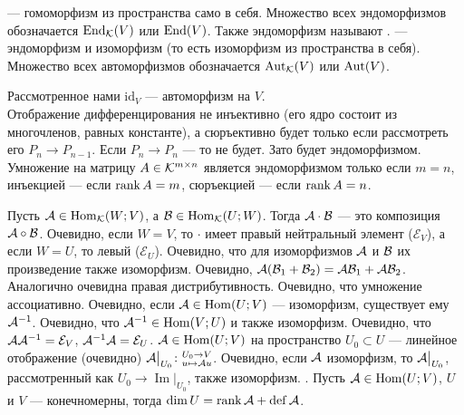 \documentclass{article}
\DeclareMathOperator{\operIm}{Im}
\let\Im\operIm
\newcommand{\id}{{\mathcal{E}}}
\begin{document}
\begin{itemize}
\begin{Proof}
        \end{Proof}
        \dfn {} --- гомоморфизм из пространства само в себя. Множество всех эндоморфизмов обозначается $\operatorname{End}_{\mathcal{K}}(V)$ или $\operatorname{End}(V)$. Также эндоморфизм называют .
        \dfn {} --- эндоморфизм и изоморфизм (то есть изоморфизм из пространства в себя). Множество всех автоморфизмов обозначается $\operatorname{Aut}_{\mathcal{K}}(V)$ или $\operatorname{Aut}(V)$.
        \begin{Example}
            Рассмотренное нами $\mathrm{id}_V$ --- автоморфизм на $V$.\\
            Отображение дифференцирования не инъективно (его ядро состоит из многочленов, равных константе), а сюръективно будет только если рассмотреть его $P_n\to P_{n-1}$. Если $P_n\to P_n$ --- то не будет. Зато будет эндоморфизмом.\\
            Умножение на матрицу $A\in{\mathcal{K}}^{m\times n}$ является эндоморфизмом только если $m=n$, инъекцией --- если $\operatorname{rank} A=m$, сюръекцией --- если $\operatorname{rank} A=n$.
        \end{Example}
        \dfn Пусть ${\mathcal{A}}\in\operatorname{Hom}_{\mathcal{K}}(W;V)$, а ${\mathcal{B}}\in\operatorname{Hom}_{\mathcal{K}}(U;W)$. Тогда  ${\mathcal{A}}\cdot{\mathcal{B}}$ --- это композиция ${\mathcal{A}}\circ{\mathcal{B}}$.
        \thm Очевидно, если $W=V$, то $\cdot$ имеет правый нейтральный элемент ($\id_V$), а если $W=U$, то левый ($\id_U$).
        \thm Очевидно, что для изоморфизмов ${\mathcal{A}}$ и ${\mathcal{B}}$ их произведение также изоморфизм.
        \thm Очевидно, ${\mathcal{A}}({\mathcal{B}}_1+{\mathcal{B}}_2)={\mathcal{A}}{\mathcal{B}}_1+{\mathcal{A}}{\mathcal{B}}_2$. Аналогично очевидна правая дистрибутивность.
        \thm Очевидно, что умножение ассоциативно.
        \dfn Очевидно, если ${\mathcal{A}}\in\operatorname{Hom}(U;V)$ --- изоморфизм, существует  ему  ${\mathcal{A}}^{-1}$.
        \thm Очевидно, что ${\mathcal{A}}^{-1}\in\operatorname{Hom}(V;U)$ и также изоморфизм.
        \thm Очевидно, что $\scriptA\scriptA^{-1}=\id_V$, $\scriptA^{-1}\scriptA=\id_U$.
        \dfn {} ${\mathcal{A}}\in\operatorname{Hom}(U;V)$ на пространство $U_0\subset U$ --- линейное отображение (очевидно) ${\mathcal{A}}\big|_{U_0}\colon\substack{U_0\to V\\u\mapsto{\mathcal{A}} u}$.
        \thm Очевидно, если ${\mathcal{A}}$ изоморфизм, то ${\mathcal{A}}\big|_{U_0}$, рассмотренный как $U_0\to\Im\big|_{U_0}$, также изоморфизм.
        \thm {}. Пусть ${\mathcal{A}}\in\operatorname{Hom}(U;V)$, $U$ и $V$ --- конечномерны, тогда $\dim U=\operatorname{rank}{\mathcal{A}}+\operatorname{def}{\mathcal{A}}$.

\end{itemize}
\end{document}
